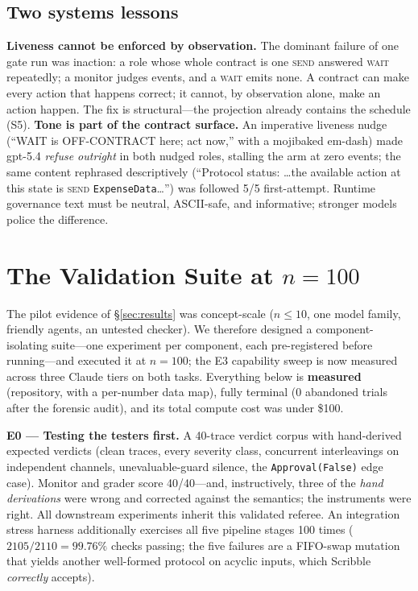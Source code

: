 \documentclass{article}
\begin{document}
\subsection{Two systems lessons}\label{sec:lessons}
\textbf{Liveness cannot be enforced by observation.} The dominant failure of one gate run was inaction: a role whose whole contract is one \textsc{send} answered \textsc{wait} repeatedly; a monitor judges events, and a \textsc{wait} emits none. A contract can make every action that happens correct; it cannot, by observation alone, make an action happen. The fix is structural---the projection already contains the schedule (S5). \textbf{Tone is part of the contract surface.} An imperative liveness nudge (``WAIT is OFF-CONTRACT here; act now,'' with a mojibaked em-dash) made gpt-5.4 \emph{refuse outright} in both nudged roles, stalling the arm at zero events; the same content rephrased descriptively (``Protocol status: \ldots the available action at this state is \textsc{send} \texttt{ExpenseData}\ldots'') was followed 5/5 first-attempt. Runtime governance text must be neutral, ASCII-safe, and informative; stronger models police the difference.

\section{The Validation Suite at $n{=}100$}\label{sec:bench}
The pilot evidence of \S\ref{sec:results} was concept-scale ($n{\leq}10$, one model family, friendly agents, an untested checker). We therefore designed a component-isolating suite---one experiment per component, each pre-registered before running---and executed it at $n{=}100$; the E3 capability sweep is now measured across three Claude tiers on both tasks. Everything below is \textbf{measured} (repository, with a per-number data map), fully terminal (0 abandoned trials after the forensic audit), and its total compute cost was under \$100.

\textbf{E0 --- Testing the testers first.} A 40-trace verdict corpus with hand-derived expected verdicts (clean traces, every severity class, concurrent interleavings on independent channels, unevaluable-guard silence, the \texttt{Approval(False)} edge case). Monitor and grader score 40/40---and, instructively, three of the \emph{hand derivations} were wrong and corrected against the semantics; the instruments were right. All downstream experiments inherit this validated referee. An integration stress harness additionally exercises all five pipeline stages 100 times ($2105/2110 = 99.76\%$ checks passing; the five failures are a FIFO-swap mutation that yields another well-formed protocol on acyclic inputs, which Scribble \emph{correctly} accepts).
\end{document}
